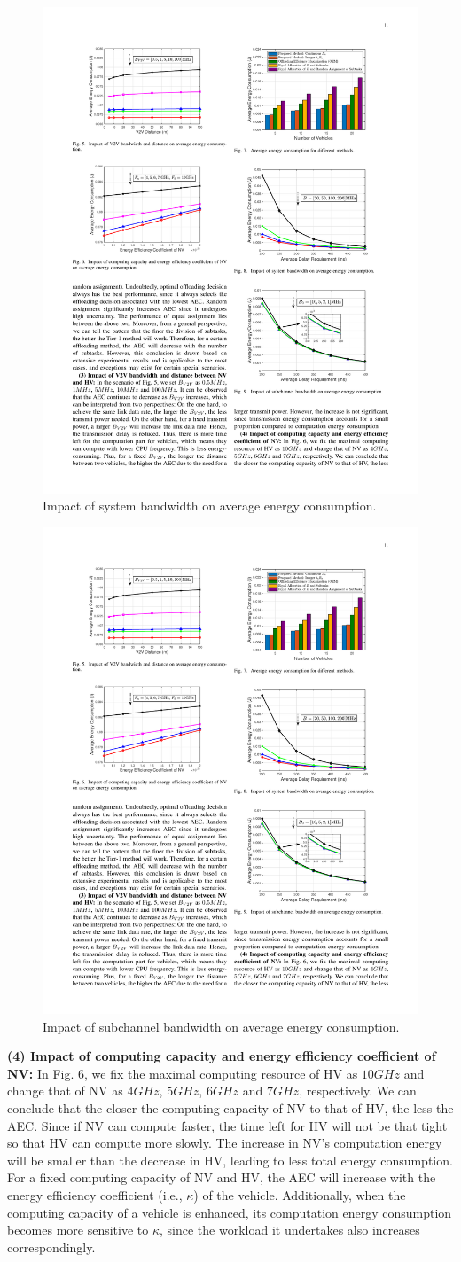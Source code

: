 \documentclass[lettersize,journal]{IEEEtran}
\begin{document}
\begin{figure}[!t]
\centering
\includegraphics[width=2.8 in]{Figures/Tier_2_E2}
\caption{Impact of system bandwidth on average energy consumption.}
\label{fig_8}
\end{figure}

\begin{figure}[!t]
\centering
\includegraphics[width=2.8 in]{Figures/Tier_2_E3}
\caption{Impact of subchannel bandwidth on average energy consumption.}
\label{fig_9}
\end{figure}

\textbf{(4) Impact of computing capacity and energy efficiency coefficient of NV:} In Fig. 6, we fix the maximal computing resource of HV as $10 GHz$ and change that of NV as $4 GHz$, $5 GHz$, $6 GHz$ and $7 GHz$, respectively. We can conclude that the closer the computing capacity of NV to that of HV, the less the AEC. Since if NV can compute faster, the time left for HV will not be that tight so that HV can compute more slowly. The increase in NV's computation energy will be smaller than the decrease in HV, leading to less total energy consumption. For a fixed computing capacity of NV and HV, the AEC will increase with the energy efficiency coefficient (i.e., $\kappa$) of the vehicle. Additionally, when the computing capacity of a vehicle is enhanced, its computation energy consumption becomes more sensitive to $\kappa$, since the workload it undertakes also increases correspondingly.
\end{document}
